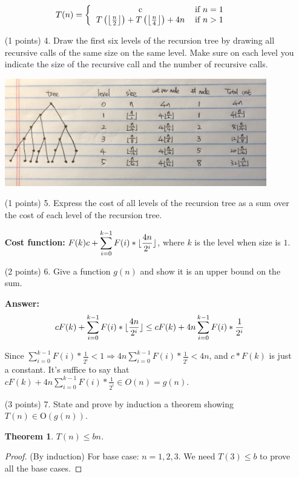 \documentclass[paper=a4, fontsize=11pt]{scrartcl}
\DeclarePairedDelimiter\floor{\lfloor}{\rfloor}
\newtheorem{theorem}{Theorem}
\numberwithin{equation}{section}		%
\numberwithin{figure}{section}			%
\numberwithin{table}{section}				%
\begin{document}
\[
T(n) = \left\{
\begin{tabular}{cc}
c & \text{if} $n=1$ \\
$T\left(\left\lfloor\frac{n}{2}\right\rfloor\right)+T\left(\left\lfloor\frac{n}{4}\right\rfloor\right)+4n$ & \text{if} $n>1$ \\
\end{tabular}\right.
\]
\begin{enumerate}
\item [(1 points) 4.] Draw the first six levels of the recursion tree by drawing all recursive calls of the same size on the same level.  Make sure on each level you indicate the size of the recursive call and the number of recursive calls. 

\includegraphics[width=0.9\textwidth]{tree.jpg}

\item [(1 points) 5.] Express the cost of all levels of the recursion tree as a sum over the cost of each level of the recursion tree.

\textbf{Cost function:} $F(k)c+\displaystyle\sum_{i=0}^{k-1}F(i)*\floor{\frac{4n}{2^i}}$, where $k$ is the level when size is $1$.


\item [(2 points) 6.] Give a function $g(n)$ and show it is an upper bound on the sum.

\textbf{Answer:}
\noindent
\begin{align*}
	cF(k)+\displaystyle\sum_{i=0}^{k-1}F(i)*\floor{\frac{4n}{2^i}} \leq cF(k)+4n\displaystyle\sum_{i=0}^{k-1}F(i)*\frac{1}{2^i}
\end{align*}

Since $\displaystyle\sum_{i=0}^{k-1}F(i)*\frac{1}{2^i} < 1 \Rightarrow 4n\displaystyle\sum_{i=0}^{k-1}F(i)*\frac{1}{2^i} < 4n$, and $c*F(k)$ is just a constant. It's suffice to say that $cF(k)+4n\displaystyle\sum_{i=0}^{k-1}F(i)*\frac{1}{2^i} \in O(n) = g(n)$.

\item [(3 points) 7.] State and prove by induction a theorem showing $T(n)\in\text{O}(g(n))$.
\begin{theorem}
	$T(n) \leq bn$.
\end{theorem}
\begin{proof}(By induction)
	For base case: $n=1,2,3$. We need $T(3)\leq b$ to prove all the base cases.
	

\end{proof}
\end{enumerate}
\end{document}
